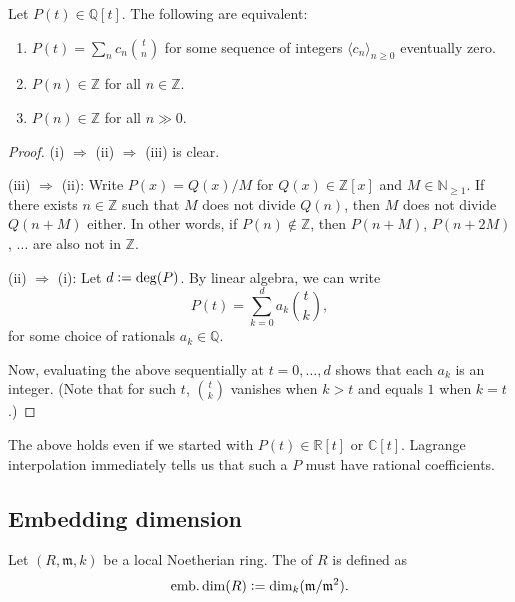 \documentclass[12pt]{article}
\begin{document}
\begin{prop}
	Let $P(t) \in \mathbb{Q}[t]$. The following are equivalent:
	\begin{enumerate}[label=(\roman*)]
		\item $P(t) = \sum_{n} c_{n} \binom{t}{n}$ for some sequence of integers $\langle c_{n} \rangle_{n \ge 0}$ eventually zero.
		\item $P(n) \in \mathbb{Z}$ for all $n \in \mathbb{Z}$.
		\item $P(n) \in \mathbb{Z}$ for all $n \gg 0$.
	\end{enumerate}
\end{prop}
\begin{proof}
	(i) $\Rightarrow$ (ii) $\Rightarrow$ (iii) is clear.

	(iii) $\Rightarrow$ (ii): Write $P(x) = Q(x)/M$ for $Q(x) \in \mathbb{Z}[x]$ and $M \in \mathbb{N}_{\ge 1}$. \newline
	If there exists $n \in \mathbb{Z}$ such that $M$ does not divide $Q(n)$, then $M$ does not divide $Q(n + M)$ either. \newline
	In other words, if $P(n) \notin \mathbb{Z}$, then $P(n + M)$, $P(n + 2M)$, $\ldots$ are also not in $\mathbb{Z}$.

	(ii) $\Rightarrow$ (i): Let $d \vcentcolon= \deg(P)$. By linear algebra, we can write
	\begin{equation*} 
		P(t) = \sum_{k = 0}^{d} a_{k} \binom{t}{k},
	\end{equation*}
	for some choice of rationals $a_{k} \in \mathbb{Q}$. 

	Now, evaluating the above sequentially at $t = 0, \ldots, d$ shows that each $a_{k}$ is an integer. (Note that for such $t$, $\binom{t}{k}$ vanishes when $k > t$ and equals $1$ when $k = t$.)
\end{proof}

\begin{rem}
	The above holds even if we started with $P(t) \in \mathbb{R}[t]$ or $\mathbb{C}[t]$. Lagrange interpolation immediately tells us that such a $P$ must have rational coefficients.
\end{rem}

\subsection{Embedding dimension}

\begin{defn}
	Let $(R, \mathfrak{m}, k)$ be a local Noetherian ring. The  of $R$ is defined as
	\begin{equation*} 
		\operatorname{emb.dim}(R) \vcentcolon= \dim_{k}(\mathfrak{m}/\mathfrak{m}^{2}).
	\end{equation*}
\end{defn}
\end{document}
